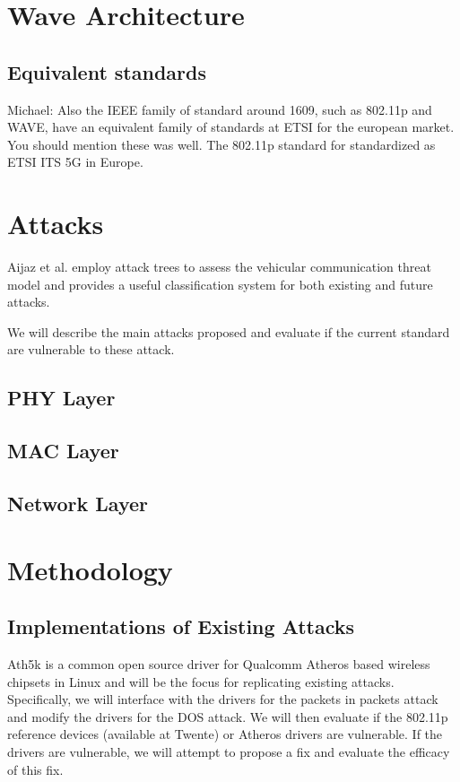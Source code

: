 \documentclass[conference]{IEEEtran}
\begin{document}
\section{Wave Architecture}


\subsection{Equivalent standards}
Michael: Also the IEEE family of standard around 1609, such as 802.11p and WAVE, have an equivalent family of standards at ETSI for the european market. You should mention these was well. The 802.11p standard for standardized as ETSI ITS 5G in Europe.


\section{Attacks}
Aijaz et al. \cite{aijaz2006attacks} employ attack trees to assess the vehicular communication threat model and provides a useful classification system for both existing and future attacks. 

We will describe the main attacks proposed and evaluate if the current standard are vulnerable to these attack. 



\subsection{PHY Layer}


\subsection{MAC Layer}




\subsection{Network Layer}



\section{Methodology}
\subsection{ Implementations of Existing Attacks}
\label{sec:existing_attacks}
Ath5k is a common open source driver for Qualcomm Atheros based wireless chipsets in Linux and will be the focus for replicating existing attacks. Specifically, we will interface with the drivers for the packets in packets attack and modify the drivers for the DOS attack. We will then evaluate if the 802.11p reference devices (available at Twente) or Atheros drivers are vulnerable. If the drivers are vulnerable, we will attempt to propose a fix and evaluate the efficacy of this fix.\\
\end{document}
